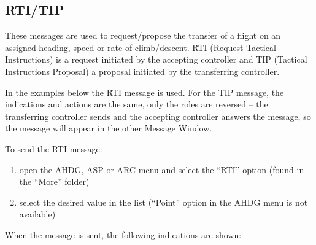 \documentclass[a4paper,oneside,11pt]{memoir}
\begin{document}

\subsection{RTI/TIP}
\label{coo:rti}\label{coo:tip}
These messages are used to request/propose the transfer of a flight on an assigned heading, speed or rate of climb/descent. RTI (Request Tactical Instructions) is a request initiated by the accepting controller and TIP (Tactical Instructions Proposal) a proposal initiated by the transferring controller.

\bigskip

In the examples below the RTI message is used. For the TIP message, the indications and actions are the same, only the roles are reversed – the transferring controller sends and the accepting controller answers the message, so the message will appear in the other Message Window.

To send the RTI message:

\begin{enumerate}
  \item open the AHDG, ASP or ARC menu and select the “RTI” option (found in the “More” folder) 
  \item select the desired value in the list (“Point” option in the AHDG menu is not available)
\end{enumerate}

When the message is sent, the following indications are shown:
\end{document}
